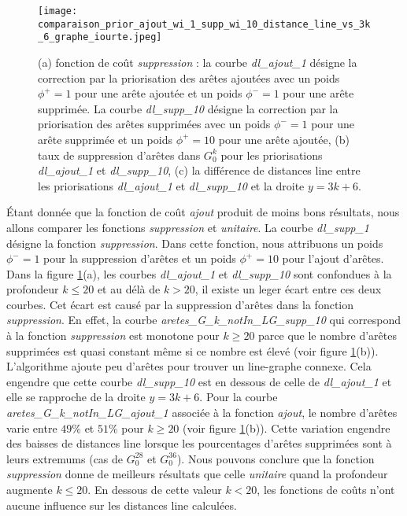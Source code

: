 \begin{figure}[htb!] 
\centering
\texttt{[image: comparaison\_prior\_ajout\_wi\_1\_supp\_wi\_10\_distance\_line\_vs\_3k\_6\_graphe\_iourte.jpeg]}
\caption{  (a) fonction de co\^ut {\em suppression} : la courbe {\em dl\_ajout\_1} d\'esigne la correction par la priorisation des ar\^etes ajout\'ees avec un poids $\phi^{+} = 1$  pour une ar\^ete ajout\'ee et un poids $\phi^{-} = 1$  pour une ar\^ete supprim\'ee.
 La courbe {\em dl\_supp\_10} d\'esigne la correction par la priorisation des ar\^etes supprim\'ees avec un poids $\phi^{-} = 1$  pour une ar\^ete supprim\'ee et un poids $\phi^{+} = 10$  pour une ar\^ete ajout\'ee,
 (b) taux de suppression d'ar\^etes dans  $G_0^k$ pour les priorisations  {\em dl\_ajout\_1} et  {\em dl\_supp\_10},
 (c) la diff\'erence de distances line entre les priorisations {\em dl\_ajout\_1} et  {\em dl\_supp\_10}  et la droite $y=3k+6$. }
\label{priorAjout1Supp10} 
\end{figure}

\'Etant donn\'ee que la fonction de co\^ut {\em ajout} produit de moins bons r\'esultats, nous allons comparer les fonctions {\em suppression} et {\em unitaire}. La courbe {\em dl\_supp\_1} d\'esigne la fonction {\em suppression}. Dans cette fonction, nous attribuons un poids $\phi^{-} = 1$ pour la suppression d'ar\^etes et un poids $\phi^{+} = 10$ pour l'ajout d'ar\^etes.
\newline
Dans la figure  \ref{priorAjout1Supp10}(a), les courbes {\em dl\_ajout\_1} et {\em dl\_supp\_10} sont confondues \`a la profondeur $k \le 20$ et au d\'el\`a de $k > 20$, il existe un leger \'ecart entre ces deux courbes. 
Cet \'ecart est caus\'e par la suppression d'ar\^etes dans la fonction {\em suppression}. 
En effet, la courbe {\em aretes\_G\_k\_notIn\_LG\_supp\_10} qui correspond \`a la fonction {\em suppression} est monotone pour $k \ge 20$ parce que le nombre d'ar\^etes supprim\'ees est quasi constant m\^eme si ce nombre est \'elev\'e (voir figure \ref{priorAjout1Supp10}(b)). L'algorithme ajoute peu d'ar\^etes pour trouver un line-graphe connexe. Cela engendre que cette courbe {\em dl\_supp\_10} est en dessous de celle de {\em dl\_ajout\_1} et elle se rapproche de la droite $y = 3k +6$. 
Pour la courbe {\em aretes\_G\_k\_notIn\_LG\_ajout\_1} associ\'ee \`a la fonction {\em ajout}, le nombre d'ar\^etes varie entre $49\%$ et $51\%$ pour $k \ge 20$ (voir figure \ref{priorAjout1Supp10}(b)). Cette variation engendre des baisses de distances line lorsque les pourcentages d'ar\^etes supprim\'ees sont \`a leurs extremums (cas de $G_0^{28}$ et  $G_0^{36}$).
\newline
Nous pouvons conclure que la fonction {\em suppression} donne de meilleurs r\'esultats que celle {\em unitaire} quand la profondeur augmente $k \le 20$. En dessous de cette valeur $k < 20$, les fonctions de co\^uts n'ont aucune influence sur les distances line calcul\'ees.




